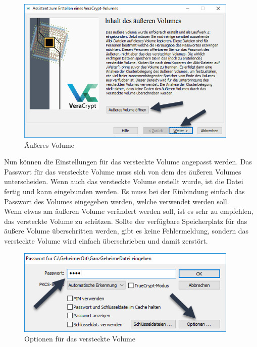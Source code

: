\documentclass[12pt,a4paper]{scrreprt}
\begin{document}
\begin{figure}[h]
\begin{center}
\includegraphics[width=300pt]{media/outervolume.png}
\caption{Äußeres Volume}
\label{outervolume}
\end{center}
\end{figure}

\noindent Nun können die Einstellungen für das versteckte Volume angepasst werden. Das Passwort für das versteckte Volume muss sich von dem des äußeren Volumes unterscheiden. Wenn auch das versteckte Volume erstellt wurde, ist die Datei fertig und kann eingebunden werden. Es muss bei der Einbindung einfach das Passwort des Volumes eingegeben werden, welche verwendet werden soll.\\

\noindent Wenn etwas am äußeren Volume verändert werden soll, ist es sehr zu empfehlen, das versteckte Volume zu schützen. Sollte der verfügbare Speicherplatz für das äußere Volume überschritten werden, gibt es keine Fehlermeldung, sondern das versteckte Volume wird einfach überschrieben und damit zerstört.

\begin{figure}[h]
\begin{center}
\includegraphics[width=300pt]{media/optionshidden.png}
\caption{Optionen für das versteckte Volume}
\label{optionshidden}
\end{center}
\end{figure}
\end{document}
